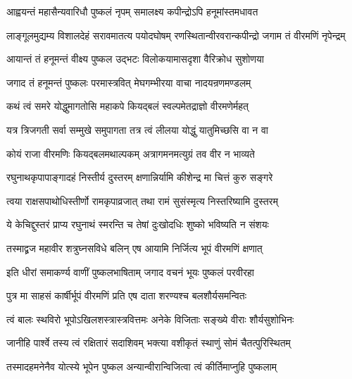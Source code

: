 

\twolineshloka
{आह्वयन्तं महासैन्यवारिधौ पुष्कलं नृपम्}
{समालक्ष्य कपीन्द्रोऽपि हनूमांस्तमधावत}%

\fourlineindentedshloka
{लाङ्गूलमुद्यम्य विशालदेहं}
{सरावमातत्य पयोदघोषम्}
{रणस्थितान्वीरवरान्कपीन्द्रो}
{जगाम तं वीरमणिं नृपेन्द्रम्}%

\twolineshloka
{आयान्तं तं हनूमन्तं वीक्ष्य पुष्कल उद्भटः}
{विलोकयामासदृशा वैरिक्रोध सुशोणया}%

\twolineshloka
{जगाद तं हनूमन्तं पुष्कलः परमास्त्रवित्}
{मेघगम्भीरया वाचा नादयन्रणमण्डलम्}%


\twolineshloka
{कथं त्वं समरे योद्धुमागतोसि महाकपे}
{कियद्बलं स्वल्पमेतद्राज्ञो वीरमणेर्महत्}%

\twolineshloka
{यत्र त्रिजगती सर्वा सम्मुखे समुपागता}
{तत्र त्वं लीलया योद्धुं यातुमिच्छसि वा न वा}%

\twolineshloka
{कोयं राजा वीरमणिः कियद्बलमथाल्पकम्}
{अत्रागमनमत्युग्रं तव वीर न भाव्यते}%

\twolineshloka
{रघुनाथकृपापाङ्गादहं निस्तीर्य दुस्तरम्}
{क्षणान्निर्यामि कीशेन्द्र मा चित्तं कुरु सङ्गरे}%

\twolineshloka
{त्वया राक्षसपाथोधिस्तीर्णो रामकृपाव्रजात्}
{तथा रामं सुसंस्मृत्य निस्तरिष्यामि दुस्तरम्}%

\twolineshloka
{ये केचिद्दुस्तरं प्राप्य रघुनाथं स्मरन्ति च}
{तेषां दुःखोदधिः शुष्को भविष्यति न संशयः}%

\twolineshloka
{तस्माद्व्रज महावीर शत्रुघ्नसविधे बलिन्}
{एष आयामि निर्जित्य भूपं वीरमणिं क्षणात्}%


\twolineshloka
{इति धीरां समाकर्ण्य वाणीं पुष्कलभाषिताम्}
{जगाद वचनं भूयः पुष्कलं परवीरहा}%


\twolineshloka
{पुत्र मा साहसं कार्षीर्भूपं वीरमणिं प्रति}
{एष दाता शरण्यश्च बलशौर्यसमन्वितः}%

\twolineshloka
{त्वं बालः स्थविरो भूपोऽखिलशस्त्रास्त्रवित्तमः}
{अनेके विजिताः सङ्ख्ये वीराः शौर्यसुशोभिनः}%

\twolineshloka
{जानीहि पार्श्वे तस्य त्वं रक्षितारं सदाशिवम्}
{भक्त्या वशीकृतं स्थाणुं सोमं चैतत्पुरिस्थितम्}%

\twolineshloka
{तस्मादहमनेनैव योत्स्ये भूपेन पुष्कल}
{अन्यान्वीरान्विजित्वा त्वं कीर्तिमाप्नुहि पुष्कलाम्}%

